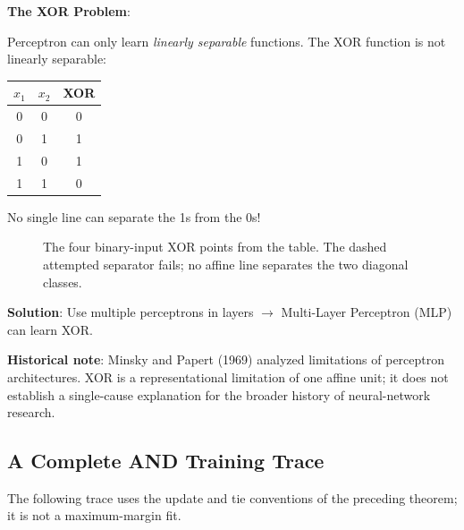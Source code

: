 \documentclass[11pt,twoside]{article}
\numberwithin{equation}{section}
\theoremstyle{plain}
\theoremstyle{definition}
\theoremstyle{remark}
\newenvironment{keyidea}{
  \begin{tcolorbox}[colback=yellow!5!white,
                    colframe=yellow!50!black,
                    title=Key Idea,
                    breakable,
                    enhanced,
                    sharp corners,
                    boxrule=0.8pt,
                    left=6pt, right=6pt, top=6pt, bottom=6pt]
}{
  \end{tcolorbox}
}
\begin{document}
\begin{keyidea}
\textbf{The XOR Problem}:

Perceptron can only learn \emph{linearly separable} functions. The XOR function is not linearly separable:

\begin{center}
\begin{tabular}{cc|c}
$x_1$ & $x_2$ & XOR \\
\hline
0 & 0 & 0 \\
0 & 1 & 1 \\
1 & 0 & 1 \\
1 & 1 & 0 \\
\end{tabular}
\end{center}

No single line can separate the 1s from the 0s!

\begin{figure}[H]
\centering
{}
\caption{The four binary-input XOR points from the table. The dashed attempted separator fails; no affine line separates the two diagonal classes.}
\end{figure}

\textbf{Solution}: Use multiple perceptrons in layers $\to$ Multi-Layer Perceptron (MLP) can learn XOR.

\textbf{Historical note}: Minsky and Papert (1969) analyzed limitations of perceptron architectures. XOR is a representational limitation of one affine unit; it does not establish a single-cause explanation for the broader history of neural-network research.
\end{keyidea}

\subsection{A Complete AND Training Trace}
The following trace uses the update and tie conventions of the preceding theorem; it is not a maximum-margin fit.
\end{document}
